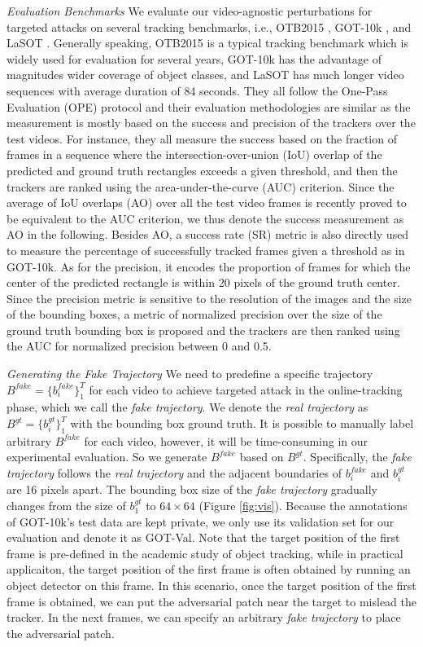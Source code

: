 \documentclass[journal]{IEEEtran}
\newcommand{\ie}{i.e.}
\begin{document}
\textit{Evaluation Benchmarks} We evaluate our video-agnostic perturbations for targeted attacks on several tracking benchmarks, \ie, OTB2015 \cite{OTB}, GOT-10k \cite{GOT-10k}, and LaSOT \cite{LaSOT}. Generally speaking, OTB2015 is a typical tracking benchmark which is widely used for evaluation for several years, GOT-10k has the advantage of magnitudes wider coverage of object classes, and LaSOT has much longer video sequences with average duration of 84 seconds. They all follow the One-Pass Evaluation (OPE) protocol and their evaluation methodologies are similar as the measurement is mostly based on the success and precision of the trackers over the test videos. For instance, they all measure the success based on the fraction of frames in a sequence where the intersection-over-union (IoU) overlap of the predicted and ground truth rectangles exceeds a given threshold, and then the trackers are ranked using the area-under-the-curve (AUC) criterion. Since the average of IoU overlaps (AO) over all the test video frames is recently proved to be equivalent to the AUC criterion, we thus denote the success measurement as AO in the following. Besides AO, a success rate (SR) metric is also directly used to measure the percentage of successfully tracked frames given a threshold as in GOT-10k. As for the precision, it encodes the proportion of frames for which the center of the predicted rectangle is within 20 pixels of the ground truth center. Since the precision metric is sensitive to the resolution of the images and the size of the bounding boxes, a metric of normalized precision over the size of the ground truth bounding box is proposed and the trackers are then ranked using the AUC for normalized precision between 0 and 0.5.

\textit{Generating the Fake Trajectory} We need to predefine a specific trajectory $B^{fake}=\{b^{fake}_i\}_1^{T}$ for each video to achieve targeted attack in the online-tracking phase, which we call the \textit{fake trajectory}. We denote the \textit{real trajectory} as $B^{gt}=\{b^{gt}_i\}_1^T$ with the bounding box ground truth.
It is possible to manually label arbitrary $B^{fake}$ for each video, however, it will be time-consuming in our experimental evaluation. So we generate $B^{fake}$ based on $B^{gt}$. Specifically, the \textit{fake trajectory} follows the \textit{real trajectory} and the adjacent boundaries of $b^{fake}_i$ and $b^{gt}_i$ are 16 pixels apart.
The bounding box size of the \textit{fake trajectory} gradually changes from the size of $b^{gt}_1$ to $64\times 64$ (Figure \ref{fig:vis}). Because the annotations of GOT-10k's test data are kept private, we only use its validation set for our evaluation and denote it as GOT-Val. Note that the target position of the first frame is pre-defined in the academic study of object tracking, while in practical applicaiton, the target position of the first frame is often obtained by running an object detector on this frame. In this scenario, once the target position of the first frame is obtained, we can put the adversarial patch near the target to mislead the tracker. In the next frames, we can specify an arbitrary \textit{fake trajectory} to place the adversarial patch.
\end{document}
